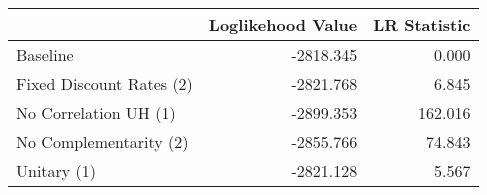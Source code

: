 \begin{tabular}{lrr}
\toprule
{} & Loglikehood Value & LR Statistic \\
\midrule
Baseline                 &         -2818.345 &        0.000 \\
Fixed Discount Rates (2) &         -2821.768 &        6.845 \\
No Correlation UH (1)    &         -2899.353 &      162.016 \\
No Complementarity (2)   &         -2855.766 &       74.843 \\
Unitary (1)              &         -2821.128 &        5.567 \\
\bottomrule
\end{tabular}
